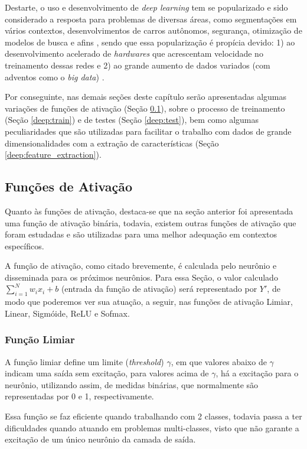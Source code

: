 Destarte, o uso e desenvolvimento de \textit{deep learning} tem se popularizado e sido considerado a resposta para problemas de diversas áreas, como segmentações em vários contextos, desenvolvimentos de carros autônomos, segurança, otimização de modelos de busca e afins \citep{Ghosh2019}, sendo que essa popularização é propícia devido: 1) ao desenvolvimento acelerado de \textit{hardwares} que acrescentam velocidade no treinamento dessas redes e 2) ao grande aumento de dados variados (com adventos como o \textit{big data}) \citep{Szegedy2015, ponti2018funciona}.

Por conseguinte, nas demais seções deste capítulo serão apresentadas algumas variações de funções de ativação (Seção \ref{deep:activation}), sobre o processo de treinamento (Seção \ref{deep:train}) e de testes (Seção \ref{deep:test}), bem como algumas peculiaridades que são utilizadas para facilitar o trabalho com dados de grande dimensionalidades com a extração de características (Seção \ref{deep:feature_extraction}).


\subsection{Funções de Ativação}
\label{deep:activation}

Quanto às funções de ativação, destaca-se que na seção anterior foi apresentada uma função de ativação binária, todavia, existem outras funções de ativação que foram estudadas e são utilizadas para uma melhor adequação em contextos específicos.

A função de ativação, como citado brevemente, é calculada pelo neurônio e disseminada para os próximos neurônios.  Para essa Seção, o valor calculado $\sum_{i = 1}^{N} w_ix_i +b$ (entrada da função de ativação) será representado por $Y'$, de modo que poderemos ver sua atuação, a seguir, nas funções de ativação Limiar, Linear, Sigmóide, ReLU e Sofmax.


\subsubsection{Função Limiar}
\label{deep:limiar}
A função limiar define um limite (\textit{threshold}) $\gamma$, em que valores abaixo de $\gamma$ indicam uma saída sem excitação, para valores acima de $\gamma$, há a excitação para o neurônio, utilizando assim, de medidas binárias, que normalmente são representadas por 0 e 1, respectivamente.

Essa função se faz eficiente quando trabalhando com 2 classes, todavia passa a ter dificuldades quando atuando em problemas multi-classes, visto que não garante a excitação de um único neurônio da camada de saída.

